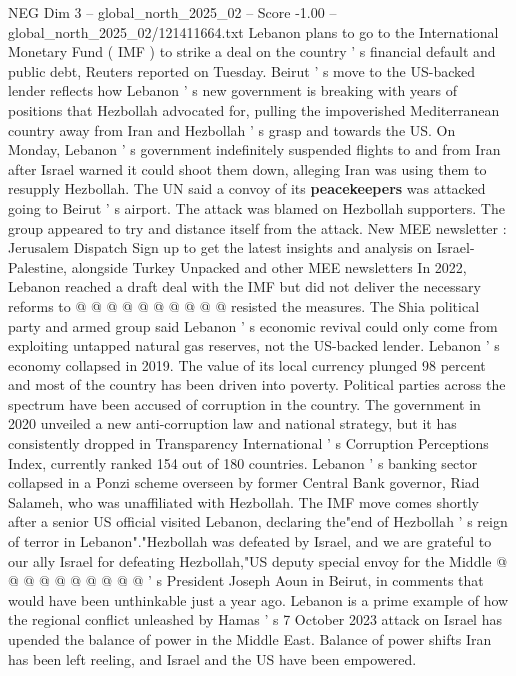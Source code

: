 \begin{textsample}{NEG Dim 3 – global\_north\_2025\_02 – Score -1.00 – global\_north\_2025\_02/121411664.txt}  \label{ex:f3_neg_171}
Lebanon plans to go to the International Monetary Fund ( IMF ) to strike a deal on the country ' s financial default and public debt, Reuters reported on Tuesday.
Beirut ' s move to the US-backed lender reflects how Lebanon ' s new government is breaking with years of positions that Hezbollah advocated for, pulling the impoverished Mediterranean country away from Iran and Hezbollah ' s grasp and towards the US.
On Monday, Lebanon ' s government indefinitely suspended flights to and from Iran after Israel warned it could shoot them down, alleging Iran was using them to resupply Hezbollah.
The UN said a convoy of its \textbf{peacekeepers} was attacked going to Beirut ' s airport.
The attack was blamed on Hezbollah supporters.
The group appeared to try and distance itself from the attack.
New MEE newsletter : Jerusalem Dispatch Sign up to get the latest insights and analysis on Israel-Palestine, alongside Turkey Unpacked and other MEE newsletters In 2022, Lebanon reached a draft deal with the IMF but did not deliver the necessary reforms to @ @ @ @ @ @ @ @ @ @ resisted the measures.
The Shia political party and armed group said Lebanon ' s economic revival could only come from exploiting untapped natural gas reserves, not the US-backed lender.
Lebanon ' s economy collapsed in 2019.
The value of its local currency plunged 98 percent and most of the country has been driven into poverty.
Political parties across the spectrum have been accused of corruption in the country.
The government in 2020 unveiled a new anti-corruption law and national strategy, but it has consistently dropped in Transparency International ' s Corruption Perceptions Index, currently ranked 154 out of 180 countries.
Lebanon ' s banking sector collapsed in a Ponzi scheme overseen by former Central Bank governor, Riad Salameh, who was unaffiliated with Hezbollah.
The IMF move comes shortly after a senior US official visited Lebanon, declaring the"end of Hezbollah ' s reign of terror in Lebanon"."Hezbollah was defeated by Israel, and we are grateful to our ally Israel for defeating Hezbollah,"US deputy special envoy for the Middle @ @ @ @ @ @ @ @ @ @ ' s President Joseph Aoun in Beirut, in comments that would have been unthinkable just a year ago.
Lebanon is a prime example of how the regional conflict unleashed by Hamas ' s 7 October 2023 attack on Israel has upended the balance of power in the Middle East.
Balance of power shifts Iran has been left reeling, and Israel and the US have been empowered.

\end{textsample}
